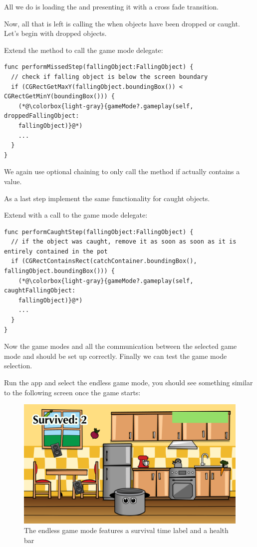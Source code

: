 All we do is loading the  and presenting it with a cross
fade transition.

Now, all that is left is calling the  when objects
have been dropped or caught. Let's begin with dropped objects.

\begin{leftbar}
Extend the  method to call the game mode
delegate:
\begin{lstlisting}
func performMissedStep(fallingObject:FallingObject) {
  // check if falling object is below the screen boundary
  if (CGRectGetMaxY(fallingObject.boundingBox()) < CGRectGetMinY(boundingBox())) {
    (*@\colorbox{light-gray}{gameMode?.gameplay(self, droppedFallingObject:
    fallingObject)}@*) 
    ...
  }
}
\end{lstlisting}
\end{leftbar}
We again use optional chaining to only call the
 method if
 actually contains a value.

As a last step implement the same functionality for caught objects.
\begin{leftbar}
Extend  with a call to the game mode delegate:
\begin{lstlisting}
func performCaughtStep(fallingObject:FallingObject) {
  // if the object was caught, remove it as soon as soon as it is entirely contained in the pot
  if (CGRectContainsRect(catchContainer.boundingBox(), fallingObject.boundingBox())) {
    (*@\colorbox{light-gray}{gameMode?.gameplay(self, caughtFallingObject:
    fallingObject)}@*) 
    ...
  }
}
\end{lstlisting}
\end{leftbar}

Now the game modes and all the communication between the selected game mode and
 should be set up correctly. Finally we can test the game
mode selection. 

Run the app and select the endless game mode, you should see something
similar to the following screen once the game starts:

\begin{figure}[H]
    \centering
    \includegraphics[width=0.5\linewidth]{images/Chapter7/endless_game_with_ui.png}
    \caption{The endless game mode features a survival time label and a health
    bar}
\end{figure}

